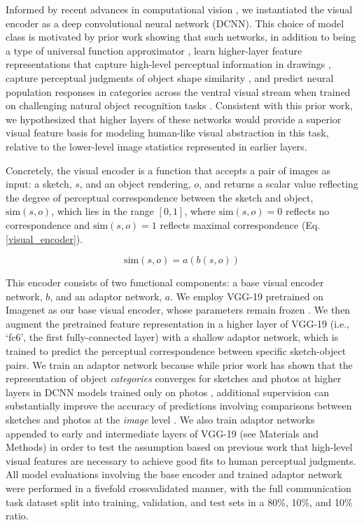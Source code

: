 \documentclass[9pt,twocolumn,twoside]{pnas-new}
\begin{document}
Informed by recent advances in computational vision \cite{FanCommon2018,yamins2014performance}, we instantiated the visual encoder as a deep convolutional neural network (DCNN). 
This choice of model class is motivated by prior work showing that such networks, in addition to being a type of universal function approximator \cite{hornik1991approximation}, learn higher-layer feature representations that capture high-level perceptual information in drawings \cite{FanCommon2018}, capture perceptual judgments of object shape similarity \cite{kubilius2016deep}, and predict neural population responses in categories across the ventral visual stream \cite{yamins2014performance} when trained on challenging natural object recognition tasks \cite{deng2009imagenet}. 
Consistent with this prior work, we hypothesized that higher layers of these networks would provide a superior visual feature basis for modeling human-like visual abstraction in this task, relative to the lower-level image statistics represented in earlier layers.

Concretely, the visual encoder is a function that accepts a pair of images as input: a sketch, $s$, and an object rendering, $o$, and returns a scalar value reflecting the degree of perceptual correspondence between the sketch and object, $\textrm{sim}(s,o)$, which lies in the range $[0,1]$, where $\textrm{sim}(s,o)=0$ reflects no correspondence and $\textrm{sim}(s,o)=1$ reflects maximal correspondence (Eq. \ref{visual_encoder}).

\begin{equation}
\label{visual_encoder}
\textrm{sim}(s,o) = a(b(s,o))
\end{equation}

This encoder consists of two functional components: a base visual encoder network, $b$, and an adaptor network, $a$. We employ VGG-19 pretrained on Imagenet as our base visual encoder, whose parameters remain frozen \cite{simonyan2014very}. 
We then augment the pretrained feature representation in a higher layer of VGG-19 (i.e., `fc6', the first fully-connected layer) with a shallow adaptor network, which is trained to predict the perceptual correspondence between specific sketch-object pairs. 
We train an adaptor network because while prior work has shown that the representation of object \textit{categories} converges for sketches and photos at higher layers in DCNN models trained only on photos \cite{FanCommon2018}, additional supervision can substantially improve the accuracy of predictions involving comparisons between sketches and photos at the \textit{image} level \cite{sangkloy2016sketchy}. 
We also train adaptor networks appended to early and intermediate layers of VGG-19 (see Materials and Methods) in order to test the assumption based on previous work that high-level visual features are necessary to achieve good fits to human perceptual judgments.
All model evaluations involving the base encoder and trained adaptor network were performed in a fivefold crossvalidated manner, with the full communication task dataset split into training, validation, and test sets in a 80\%, 10\%, and 10\% ratio. 
\end{document}
